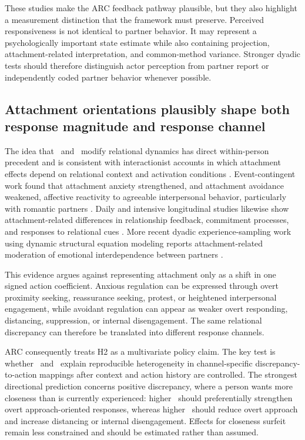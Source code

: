 These studies make the ARC feedback pathway plausible, but they also highlight a measurement distinction that the framework must preserve. Perceived responsiveness is not identical to partner behavior. It may represent a psychologically important state estimate while also containing projection, attachment-related interpretation, and common-method variance. Stronger dyadic tests should therefore distinguish actor perception from partner report or independently coded partner behavior whenever possible.

\subsection{Attachment orientations plausibly shape both response magnitude and response channel}

The idea that \Anx\ and \Avo\ modify relational dynamics has direct within-person precedent and is consistent with interactionist accounts in which attachment effects depend on relational context and activation conditions \parencite{campbell2011interactionist}. Event-contingent work found that attachment anxiety strengthened, and attachment avoidance weakened, affective reactivity to agreeable interpersonal behavior, particularly with romantic partners \parencite{sadikaj2011dynamics}. Daily and intensive longitudinal studies likewise show attachment-related differences in relationship feedback, commitment processes, and responses to relational cues \parencite{segal2016responsiveness,beck2024daily,carnelley2025phubbing}. More recent dyadic experience-sampling work using dynamic structural equation modeling reports attachment-related moderation of emotional interdependence between partners \parencite{xie2025interdependence}.

This evidence argues against representing attachment only as a shift in one signed action coefficient. Anxious regulation can be expressed through overt proximity seeking, reassurance seeking, protest, or heightened interpersonal engagement, while avoidant regulation can appear as weaker overt responding, distancing, suppression, or internal disengagement. The same relational discrepancy can therefore be translated into different response channels.

ARC consequently treats H2 as a multivariate policy claim. The key test is whether \Anx\ and \Avo\ explain reproducible heterogeneity in channel-specific discrepancy-to-action mappings after context and action history are controlled. The strongest directional prediction concerns positive discrepancy, where a person wants more closeness than is currently experienced: higher \Anx\ should preferentially strengthen overt approach-oriented responses, whereas higher \Avo\ should reduce overt approach and increase distancing or internal disengagement. Effects for closeness surfeit remain less constrained and should be estimated rather than assumed.

